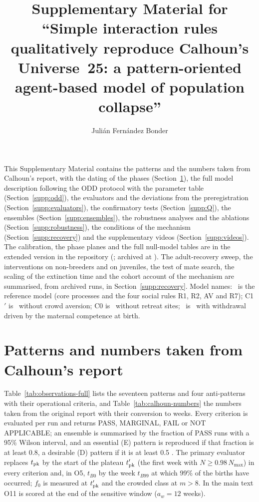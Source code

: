 \documentclass[preprint,12pt,authoryear]{elsarticle}
\begin{document}
\begin{frontmatter}
\title{Supplementary Material for ``Simple interaction rules qualitatively reproduce Calhoun's Universe~25: a
pattern-oriented agent-based model of population collapse''}
\author{Juli\'an Fern\'andez Bonder}
\end{frontmatter}

\sloppy
This Supplementary Material contains the patterns and the numbers taken from Calhoun's report, with the dating of
the phases (Section~\ref{supp:patterns}), the full model description following the ODD protocol with the parameter
table (Section~\ref{supp:odd}), the evaluators and the deviations from the preregistration
(Section~\ref{supp:evaluators}), the confirmatory tests (Section~\ref{supp:Q}), the ensembles
(Section~\ref{supp:ensembles}), the robustness analyses and the ablations (Section~\ref{supp:robustness}), the
conditions of the mechanism (Section~\ref{supp:recovery}) and the supplementary videos (Section~\ref{supp:videos}).
The calibration, the phase planes and the full null-model tables are in the extended version in the repository
(\repourl; archived at \zenodo). The adult-recovery sweep, the interventions on non-breeders and on juveniles, the test of mate search, the scaling
of the extinction time and the cohort account of the mechanism are summarised, from archived runs, in
Section~\ref{supp:recovery}.
Model names: \Cone\ is the reference model (core processes and the four social rules R1, R2, AV and R7);
\textsf{C1}$'$ is \Cone\ without crowd aversion; \textsf{C0} is \Cone\ without retreat sites; \Ctwo\ is \Cone\ with
withdrawal driven by the maternal competence at birth.

\section{Patterns and numbers taken from Calhoun's report}
\label{supp:patterns}

Table~\ref{tab:observations-full} lists the seventeen patterns and four anti-patterns with their operational
criteria, and Table~\ref{tab:calhoun-numbers} the numbers taken from the original report \citep{Calhoun1973} with
their conversion to weeks. Every criterion is evaluated per run and returns PASS, MARGINAL, FAIL or NOT APPLICABLE;
an ensemble is summarised by the fraction of PASS runs with a 95\% Wilson interval, and an essential (E) pattern is
reproduced if that fraction is at least 0.8, a desirable (D) pattern if it is at least 0.5 \citep{Grimm2005}. The
primary evaluator replaces $t_{\rm pk}$ by the start of the plateau $t'_{\rm pk}$ (the first week with
$N\ge0.98\,N_{\max}$) in every criterion and, in O5, $t_{B0}$ by the week $t_{B99}$ at which 99\% of the births have
occurred; $f_0$ is measured at $t'_{\rm pk}$ and the crowded class at $m>8$. In the main text O11 is scored at the
end of the sensitive window ($a_w=12$ weeks).
\end{document}
